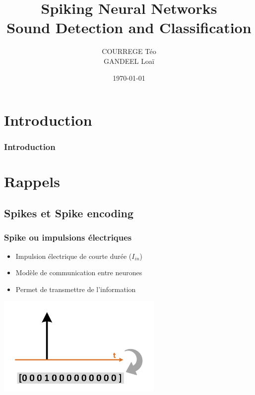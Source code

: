 \documentclass[aspectratio=169]{beamer}
\title{Spiking Neural Networks \\Sound Detection and Classification}
\subtitle{}
\date{\today}
\author{COURREGE Téo\\GANDEEL Loaï}
\institute{\url{https://github.com/LGPolytech/Project\_S9}}
\begin{document}
\maketitle

\section{Introduction}

\begin{frame}
  \frametitle{Introduction}
  \tableofcontents

\end{frame}


\section{Rappels}

\subsection{Spikes et Spike encoding}
\begin{frame}
  \frametitle{Spike ou impulsions électriques}

  \begin{itemize}
    \item Impulsion électrique de courte durée ($I_{in}$)
    \item Modèle de communication entre neurones
    \item Permet de transmettre de l'information
  \end{itemize}

  \begin{center}
    \includegraphics[width=0.6\textwidth]{image/spikeboy.png}
  \end{center}

\end{frame}
\end{document}
